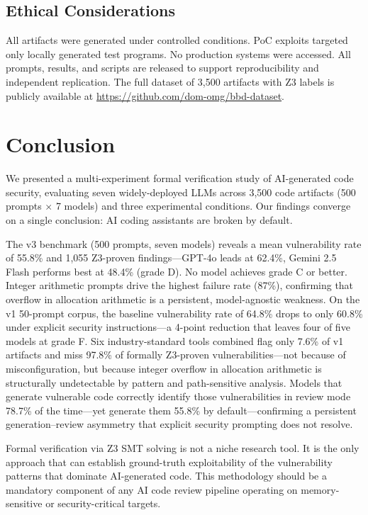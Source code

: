 \documentclass[10pt,twocolumn]{article}
\begin{document}
\subsection{Ethical Considerations}

All artifacts were generated under controlled conditions. PoC exploits
targeted only locally generated test programs. No production systems
were accessed. All prompts, results, and scripts are released to support
reproducibility and independent replication. The full dataset of 3,500
artifacts with Z3 labels is publicly available at
\url{https://github.com/dom-omg/bbd-dataset}.

\section{Conclusion}

We presented a multi-experiment formal verification study of AI-generated
code security, evaluating seven widely-deployed LLMs across 3,500 code artifacts
(500 prompts $\times$ 7 models) and three experimental conditions. Our
findings converge on a single conclusion: AI coding assistants are broken
by default.

The v3 benchmark (500 prompts, seven models) reveals a mean
vulnerability rate of 55.8\% and 1,055 Z3-proven findings---GPT-4o
leads at 62.4\%, Gemini 2.5 Flash performs best at 48.4\% (grade D). No
model achieves grade C or better. Integer arithmetic prompts drive the
highest failure rate (87\%), confirming that overflow in allocation
arithmetic is a persistent, model-agnostic weakness. On the v1 50-prompt
corpus, the baseline vulnerability rate of 64.8\% drops to only 60.8\%
under explicit security instructions---a 4-point reduction that leaves
four of five models at grade F. Six industry-standard tools combined flag
only 7.6\% of v1 artifacts and miss 97.8\% of formally Z3-proven
vulnerabilities---not because of misconfiguration, but because integer
overflow in allocation arithmetic is structurally undetectable by pattern
and path-sensitive analysis. Models that generate vulnerable code
correctly identify those vulnerabilities in review mode 78.7\% of the
time---yet generate them 55.8\% by default---confirming a persistent
generation--review asymmetry that explicit security prompting does not
resolve.

Formal verification via Z3 SMT solving is not a niche research tool. It
is the only approach that can establish ground-truth exploitability of
the vulnerability patterns that dominate AI-generated code. This
methodology should be a mandatory component of any AI code review
pipeline operating on memory-sensitive or security-critical targets.
\end{document}
